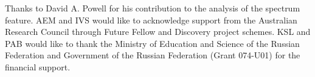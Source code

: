 \documentclass[aps,prl,twocolumn,showpacs,superscriptaddress,groupedaddress]{revtex4-1}
\begin{document}
\begin{acknowledgments}
  Thanks to David A. Powell for his contribution to the analysis of
  the spectrum feature.  AEM and IVS would like to acknowledge support
  from the Australian Research Council through Future Fellow and
  Discovery project schemes. KSL and PAB would like to thank the
  Ministry of Education and Science of the Russian Federation and
  Government of the Russian Federation (Grant 074-U01) for the
  financial support.
\end{acknowledgments}


\end{document}
